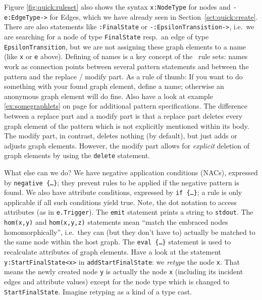Figure \ref{fig:quick:ruleset} also shows the syntax \texttt{x:NodeType} for nodes and \texttt{-e:EdgeType->} for Edges, which we have already seen in Section~\ref{sct:quick:create}.
There are also statements like \texttt{:FinalState} or \texttt{-:EpsilonTransistion->}, i.e.\ we are searching for a node of type \texttt{FinalState} resp.\ an edge of type \texttt{EpsilonTransition}, but we are not assigning these graph elements to a name (like \texttt{x} or \texttt{e} above).
Defining of names is a key concept of the \GrG\ rule sets: names work as connection points between several pattern statements and between the pattern and the replace / modify part.
As a rule of thumb: If you want to do something with your found graph element, define a name; otherwise an anonymous graph element will do fine.
Also have a look at example \ref{ex:somegraphlets} on page \pageref{ex:somegraphlets} for additional pattern specifications.
The difference between a replace part and a modify part is that a replace part deletes every graph element of the pattern which is not explicitly mentioned within its body.
The modify part, in contrast, deletes nothing (by default), but just adds or adjusts graph elements.
However, the modify part allows for \emph{explicit} deletion of graph elements by using the \texttt{delete} statement.

What else can we do? 
We have negative application conditions (NACs), expressed by \texttt{negative \{\dots\}}; they prevent rules to be applied if the negative pattern is found.
We also have attribute conditions, expressed by \texttt{if \{\dots\}}; a rule is only applicable if all such conditions yield true.
Note, the dot notation to access attributes (as in \texttt{e.Trigger}).
The \texttt{emit} statement prints a string to \texttt{stdout}.
The \texttt{hom(x,y)} and \texttt{hom(x,y,z)} statements mean ``match the embraced nodes homomorphically'', i.e.\ they can (but they don't have to) actually be matched to the same node within the host graph.
The \texttt{eval \{\dots\}} statement is used to recalculate attributes of graph elements.
Have a look at the statement \texttt{y:StartFinalState<x>} in \texttt{addStartFinalState}: we \emph{retype} the node \texttt{x}.
That means the newly created node \texttt{y} is actually the node \texttt{x} (including its incident edges and attribute values) except for the node type which is changed to \texttt{StartFinalState}.
Imagine retyping as a kind of a type cast.

